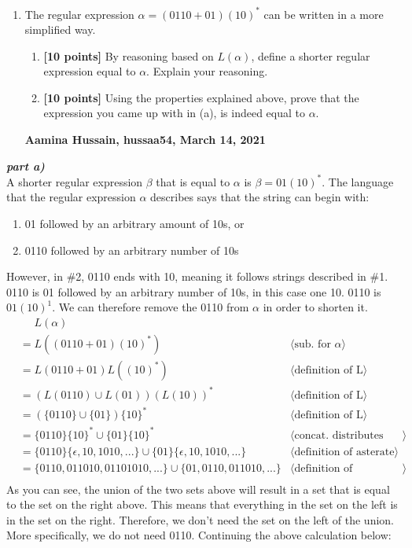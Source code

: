 \documentclass[11pt,fleqn]{article}
\newcommand{\be}{\begin{enumerate}}
\newcommand{\ee}{\end{enumerate}}
\newcommand{\pnote}[1]{{\langle \text{#1} \rangle}}
\begin{document}
	\be
	
	\item The regular expression $\alpha = (0110 + 01) (10)^*$ can be written in a more simplified way. 
	\be
	\item \textbf{[10 points]} By reasoning based on $L(\alpha)$, define a shorter regular expression equal to $\alpha$. Explain your reasoning.
	\item \textbf{[10 points]} Using the properties explained above, prove that the expression you came up with in (a), is indeed equal to $\alpha$.
	\ee
	
	\bigskip
	
	\textbf{Aamina Hussain, hussaa54, March 14, 2021}

    \medskip    

\ee

\textbf{\emph{part a)}}\\
A shorter regular expression $\beta$ that is equal to $\alpha$ is $\beta = 01(10)^*$. The language that the regular expression $\alpha$ describes says that the string can begin with:
\be
\item 01 followed by an arbitrary amount of 10s, or
\item 0110 followed by an arbitrary number of 10s
\ee
However, in \#2, 0110 ends with 10, meaning it follows strings described in \#1. 0110 is 01 followed by an arbitrary number of 10s, in this case one 10. 0110 is $01(10)^1$. We can therefore remove the 0110 from $\alpha$ in order to shorten it.
\begin{align*}
    &\phantom{{}=} L(\alpha) \\
    &= L((0110+01)(10)^*) & \pnote{sub. for $\alpha$}\\
    &= L(0110+01)L((10)^*) & \pnote{definition of L}\\
    &= (L(0110) \cup L(01))(L(10))^* & \pnote{definition of L}\\
    &= (\{0110\} \cup \{01\})\{10\}^* & \pnote{definition of L}\\
    &= \{0110\}\{10\}^* \cup \{01\}\{10\}^* & \pnote{concat. distributes over union}\\
    &= \{0110\}\{\epsilon, 10, 1010,...\} \cup \{01\}\{\epsilon, 10, 1010,...\} & \pnote{definition of asterate}\\
    &= \{0110, 011010, 01101010,...\} \cup \{01, 0110, 011010,...\} & \pnote{definition of concatenation}\\
\end{align*}
As you can see, the union of the two sets above will result in a set that is equal to the set on the right above. This means that everything in the set on the left is in the set on the right. Therefore, we don't need the set on the left of the union. More specifically, we do not need 0110. Continuing the above calculation below:
\end{document}

